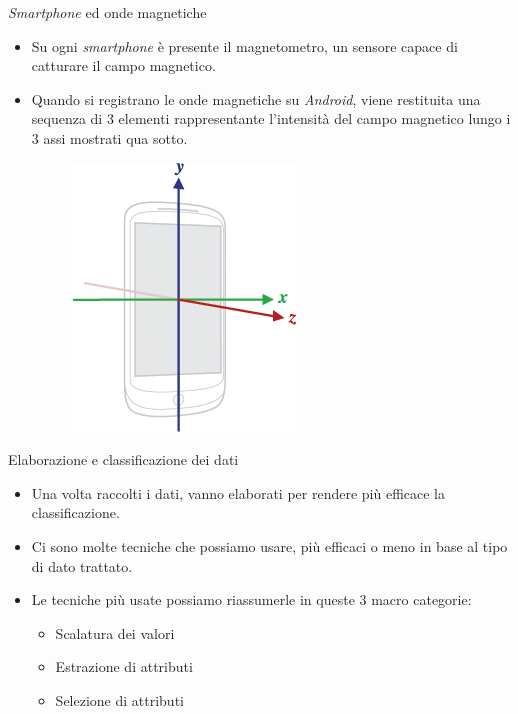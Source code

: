 \documentclass[11pt]{beamer}
\begin{document}
	\begin{frame}{\textit{Smartphone} ed onde magnetiche}
		\begin{itemize}
			\item Su ogni \textit{smartphone} \`e presente il magnetometro, un sensore capace di catturare il campo magnetico.
			\item Quando si registrano le onde magnetiche su \textit{Android}, viene restituita una sequenza di 3 elementi rappresentante l'intensit\`a del campo magnetico lungo i 3 assi mostrati qua sotto.
			\begin{figure}
				\centering
				\includegraphics[width=0.4\linewidth]{img/axis_magnetic_field}
			\end{figure}
		\end{itemize}
	\end{frame}
	\begin{frame}{Elaborazione e classificazione dei dati}
		\begin{itemize}
			\item Una volta raccolti i dati, vanno elaborati per rendere pi\`u efficace la classificazione.
			\item Ci sono molte tecniche che possiamo usare, pi\`u efficaci o meno in base al tipo di dato trattato.
			\item Le tecniche pi\`u usate possiamo riassumerle in queste 3 macro categorie:
				\begin{itemize}
					\item Scalatura dei valori
					\item Estrazione di attributi
					\item Selezione di attributi
				\end{itemize}
		\end{itemize}
	\end{frame}
\end{document}
